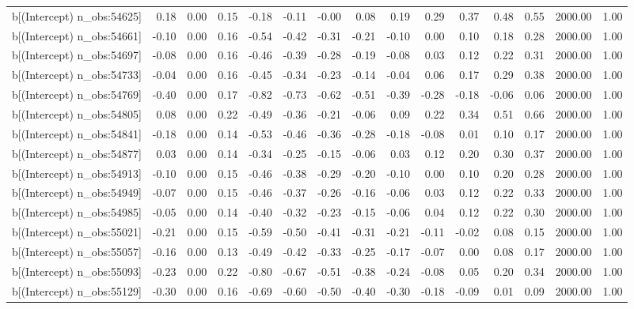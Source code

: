\begin{table}[ht]
\begin{tabular}{rrrrrrrrrrrrrrr}
  b[(Intercept) n\_obs:54625] & 0.18 & 0.00 & 0.15 & -0.18 & -0.11 & -0.00 & 0.08 & 0.19 & 0.29 & 0.37 & 0.48 & 0.55 & 2000.00 & 1.00 \\ 
  b[(Intercept) n\_obs:54661] & -0.10 & 0.00 & 0.16 & -0.54 & -0.42 & -0.31 & -0.21 & -0.10 & 0.00 & 0.10 & 0.18 & 0.28 & 2000.00 & 1.00 \\ 
  b[(Intercept) n\_obs:54697] & -0.08 & 0.00 & 0.16 & -0.46 & -0.39 & -0.28 & -0.19 & -0.08 & 0.03 & 0.12 & 0.22 & 0.31 & 2000.00 & 1.00 \\ 
  b[(Intercept) n\_obs:54733] & -0.04 & 0.00 & 0.16 & -0.45 & -0.34 & -0.23 & -0.14 & -0.04 & 0.06 & 0.17 & 0.29 & 0.38 & 2000.00 & 1.00 \\ 
  b[(Intercept) n\_obs:54769] & -0.40 & 0.00 & 0.17 & -0.82 & -0.73 & -0.62 & -0.51 & -0.39 & -0.28 & -0.18 & -0.06 & 0.06 & 2000.00 & 1.00 \\ 
  b[(Intercept) n\_obs:54805] & 0.08 & 0.00 & 0.22 & -0.49 & -0.36 & -0.21 & -0.06 & 0.09 & 0.22 & 0.34 & 0.51 & 0.66 & 2000.00 & 1.00 \\ 
  b[(Intercept) n\_obs:54841] & -0.18 & 0.00 & 0.14 & -0.53 & -0.46 & -0.36 & -0.28 & -0.18 & -0.08 & 0.01 & 0.10 & 0.17 & 2000.00 & 1.00 \\ 
  b[(Intercept) n\_obs:54877] & 0.03 & 0.00 & 0.14 & -0.34 & -0.25 & -0.15 & -0.06 & 0.03 & 0.12 & 0.20 & 0.30 & 0.37 & 2000.00 & 1.00 \\ 
  b[(Intercept) n\_obs:54913] & -0.10 & 0.00 & 0.15 & -0.46 & -0.38 & -0.29 & -0.20 & -0.10 & 0.00 & 0.10 & 0.20 & 0.28 & 2000.00 & 1.00 \\ 
  b[(Intercept) n\_obs:54949] & -0.07 & 0.00 & 0.15 & -0.46 & -0.37 & -0.26 & -0.16 & -0.06 & 0.03 & 0.12 & 0.22 & 0.33 & 2000.00 & 1.00 \\ 
  b[(Intercept) n\_obs:54985] & -0.05 & 0.00 & 0.14 & -0.40 & -0.32 & -0.23 & -0.15 & -0.06 & 0.04 & 0.12 & 0.22 & 0.30 & 2000.00 & 1.00 \\ 
  b[(Intercept) n\_obs:55021] & -0.21 & 0.00 & 0.15 & -0.59 & -0.50 & -0.41 & -0.31 & -0.21 & -0.11 & -0.02 & 0.08 & 0.15 & 2000.00 & 1.00 \\ 
  b[(Intercept) n\_obs:55057] & -0.16 & 0.00 & 0.13 & -0.49 & -0.42 & -0.33 & -0.25 & -0.17 & -0.07 & 0.00 & 0.08 & 0.17 & 2000.00 & 1.00 \\ 
  b[(Intercept) n\_obs:55093] & -0.23 & 0.00 & 0.22 & -0.80 & -0.67 & -0.51 & -0.38 & -0.24 & -0.08 & 0.05 & 0.20 & 0.34 & 2000.00 & 1.00 \\ 
  b[(Intercept) n\_obs:55129] & -0.30 & 0.00 & 0.16 & -0.69 & -0.60 & -0.50 & -0.40 & -0.30 & -0.18 & -0.09 & 0.01 & 0.09 & 2000.00 & 1.00 \\ 

\end{tabular}
\end{table}
